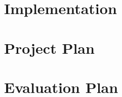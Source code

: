 \documentclass{article}
\begin{document}






\section{Implementation}


\section{Project Plan}


\section{Evaluation Plan}

\end{document}

